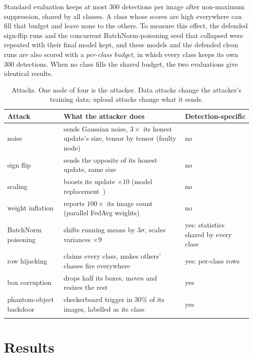 \documentclass[pdflatex,sn-mathphys-num]{sn-jnl}
\begin{document}
Standard evaluation keeps at most 300 detections per image after non-maximum suppression, shared by all classes. A class whose scores are high everywhere can fill that budget and leave none to the others. To measure this effect, the defended sign-flip runs and the concurrent BatchNorm-poisoning seed that collapsed were repeated with their final model kept, and these models and the defended clean runs are also scored with a \emph{per-class budget}, in which every class keeps its own 300 detections. When no class fills the shared budget, the two evaluations give identical results.

\begin{table}[t]
\caption{Attacks. One node of four is the attacker. Data attacks change the attacker's training data; upload attacks change what it sends.}\label{tab:attacks}
\footnotesize
\begin{tabular*}{\textwidth}{@{\extracolsep\fill}>{\raggedright\arraybackslash}p{}>{\raggedright\arraybackslash}p{}>{\raggedright\arraybackslash}p{}}
\toprule
Attack & What the attacker does & Detection-specific \\
\midrule
noise & sends Gaussian noise, $3\times$ its honest update's size, tensor by tensor (faulty node) & no \\
sign flip & sends the opposite of its honest update, same size & no \\
scaling & boosts its update $\times10$ (model replacement~\cite{bagdasaryan2020backdoor}) & no \\
weight inflation & reports $100\times$ its image count (parallel FedAvg weights) & no \\
BatchNorm poisoning & shifts running means by $3\sigma$, scales variances $\times9$ & yes: statistics shared by every class \\
row hijacking & claims every class, makes others' classes fire everywhere & yes: per-class rows \\
box corruption & drops half its boxes, moves and resizes the rest & yes \\
phantom-object backdoor & checkerboard trigger in 30\% of its images, labelled as its class~\cite{chan2022baddet} & yes \\
\botrule
\end{tabular*}
\end{table}

\section{Results}\label{sec:results}
\end{document}
